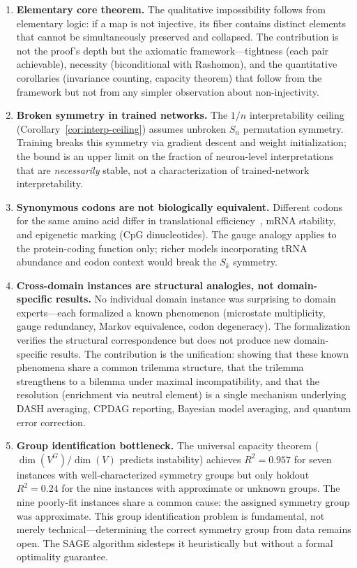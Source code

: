 \documentclass[11pt,a4paper]{article}
\begin{document}
\begin{enumerate}[label=(\arabic*)]
  \item \textbf{Elementary core theorem.}  The qualitative impossibility
    follows from elementary logic: if a map is not injective, its fiber
    contains distinct elements that cannot be simultaneously preserved and
    collapsed.  The contribution is not the proof's depth but the
    axiomatic framework---tightness (each pair achievable), necessity
    (biconditional with Rashomon), and the quantitative corollaries
    (invariance counting, capacity theorem) that follow from the framework but not
    from any simpler observation about non-injectivity.
  \item \textbf{Broken symmetry in trained networks.}  The $1/n$
    interpretability ceiling (Corollary~\ref{cor:interp-ceiling}) assumes
    unbroken $S_n$ permutation symmetry.  Training breaks this symmetry
    via gradient descent and weight initialization; the bound is an upper
    limit on the fraction of neuron-level interpretations that are
    \emph{necessarily} stable, not a characterization of trained-network
    interpretability.
  \item \textbf{Synonymous codons are not biologically equivalent.}
    Different codons for the same amino acid differ in translational
    efficiency~\citep{ikemura1985codon}, mRNA
    stability, and epigenetic marking (CpG dinucleotides).  The gauge
    analogy applies to the protein-coding function only; richer models
    incorporating tRNA abundance and codon context would break the
    $S_k$ symmetry.
  \item \textbf{Cross-domain instances are structural analogies, not domain-specific results.}  No individual domain instance was surprising to domain experts---each formalized a known phenomenon (microstate multiplicity, gauge redundancy, Markov equivalence, codon degeneracy).  The formalization verifies the structural correspondence but does not produce new domain-specific results.  The contribution is the unification: showing that these known phenomena share a common trilemma structure, that the trilemma strengthens to a bilemma under maximal incompatibility, and that the resolution (enrichment via neutral element) is a single mechanism underlying DASH averaging, CPDAG reporting, Bayesian model averaging, and quantum error correction.
  \item \textbf{Group identification bottleneck.}  The universal capacity theorem ($\dim(V^G)/\dim(V)$ predicts instability) achieves $R^2 = 0.957$ for seven instances with well-characterized symmetry groups but only holdout $R^2 = 0.24$ for the nine instances with approximate or unknown groups.  The nine poorly-fit instances share a common cause: the assigned symmetry group was approximate.  This group identification problem is fundamental, not merely technical---determining the correct symmetry group from data remains open.  The SAGE algorithm sidesteps it heuristically but without a formal optimality guarantee.


\end{enumerate}
\end{document}
